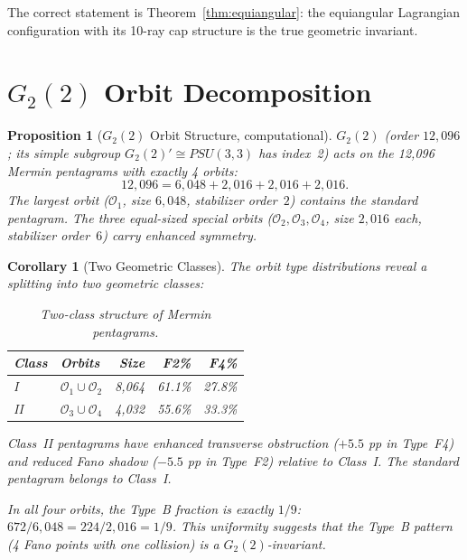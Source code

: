 \documentclass[11pt,a4paper]{article}
\newtheorem{corollary}[theorem]{Corollary}
\newtheorem{proposition}[theorem]{Proposition}
\theoremstyle{remark}
\begin{document}
The correct statement is Theorem~\ref{thm:equiangular}: the equiangular
Lagrangian configuration with its 10-ray cap structure is the true
geometric invariant.

\section{\texorpdfstring{$G_2(2)$}{G2(2)} Orbit Decomposition}
\label{sec:orbits}

\begin{proposition}[$G_2(2)$ Orbit Structure, computational]
\label{prop:orbits}
$G_2(2)$ (order $12{,}096$; its simple subgroup $G_2(2)' \cong PSU(3,3)$
has index~2) acts on the 12{,}096 Mermin pentagrams with exactly 4 orbits:
\[
12{,}096 = 6{,}048 + 2{,}016 + 2{,}016 + 2{,}016.
\]
The largest orbit ($\mathcal{O}_1$, size $6{,}048$, stabilizer order~$2$)
contains the standard pentagram. The three equal-sized special orbits
($\mathcal{O}_2, \mathcal{O}_3, \mathcal{O}_4$, size $2{,}016$ each,
stabilizer order~$6$) carry enhanced symmetry.
\end{proposition}

\begin{corollary}[Two Geometric Classes]
\label{cor:two-classes}
The orbit type distributions reveal a splitting into two geometric
classes:

\begin{table}[h]
\centering
\begin{tabular}{l l r r r}
\toprule
Class & Orbits & Size & F2\% & F4\% \\
\midrule
I & $\mathcal{O}_1 \cup \mathcal{O}_2$ & 8{,}064 & 61.1\% & 27.8\% \\
II & $\mathcal{O}_3 \cup \mathcal{O}_4$ & 4{,}032 & 55.6\% & 33.3\% \\
\bottomrule
\end{tabular}
\caption{Two-class structure of Mermin pentagrams.}
\label{tab:two-classes}
\end{table}

Class~II pentagrams have enhanced transverse obstruction ($+5.5$ pp in
Type~F4) and reduced Fano shadow ($-5.5$ pp in Type~F2) relative to
Class~I. The standard pentagram belongs to Class~I.

In all four orbits, the Type~B fraction is exactly $1/9$:
$672/6{,}048 = 224/2{,}016 = 1/9$.
This uniformity suggests that the Type~B pattern (4 Fano points with
one collision) is a $G_2(2)$-invariant.
\end{corollary}
\end{document}
